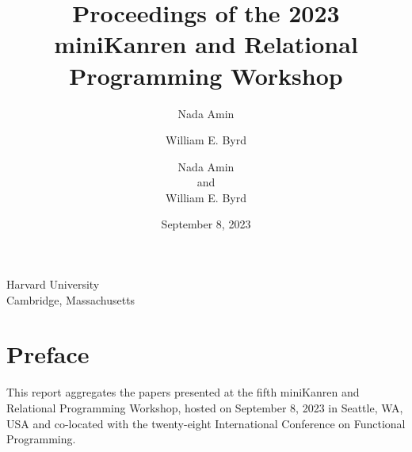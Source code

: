 \documentclass[a4paper]{book}
\date{September 8, 2023}
\author{Nada Amin \and William E. Byrd}
\begin{document}
\frontmatter
\setcounter{page}{3}  %

\title{\vspace{-3cm}Proceedings of the 2023 miniKanren and Relational Programming Workshop}
\author{Nada Amin \\ and \\ William E. Byrd}
\date{}

\begin{titlepage}
  \centering
  \vspace*{4cm}
  
  {\LARGE \thetitle}
  
  \vspace{1.5cm}
  
  {\large \theauthor}
  
  \vspace{1.5cm}
  
  
  \vspace{1cm}
  
  
  \vspace{12cm}
  
  
  
  
  
  

  {\large
    Harvard University \\
    Cambridge, Massachusetts}
  
  \vfill
\end{titlepage}

\chapter*{Preface}
This report aggregates the papers presented at the fifth miniKanren
and Relational Programming Workshop, hosted on September 8, 2023 in
Seattle, WA, USA and co-located with the twenty-eight International
Conference on Functional Programming.
\end{document}
